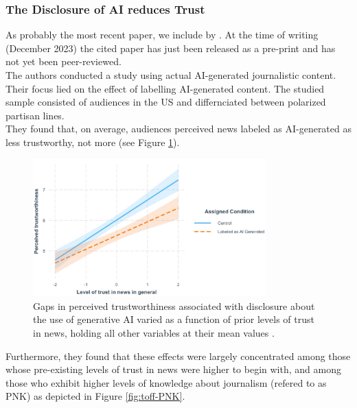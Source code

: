 \documentclass[
  a4paper,  %
  twoside,  %
  bibliography=totoc,
  headsepline,
  cleardoublepage=empty,
  parskip=half,
  draft=false
]{scrbook}
\begin{document}
\subsubsection*{The Disclosure of AI reduces Trust}
As probably the most recent paper, we include  by \citeauthor{toffTheyCouldJust2023}. At the time of writing (December 2023) the cited paper has just been released as a pre-print and has not yet been peer-reviewed. \\
The authors conducted a study using actual AI-generated journalistic content. Their focus lied on the effect of labelling AI-generated content. The studied sample consisted of audiences in the US and differnciated between polarized partisan lines. \\
They found that, on average, audiences perceived news labeled as AI-generated as less trustworthy, not more (see Figure \ref{fig:toff-trust}). 

\begin{figure}[h]
  \centering
  \includegraphics[width=0.8\textwidth]{./graphics/toff/Trust in news.png}
  \caption{Gaps in perceived trustworthiness associated with disclosure about the use of generative AI varied as a function of prior levels of trust in news, holding all other variables at their mean values \cite{toffTheyCouldJust2023}.}
  \label{fig:toff-trust}
\end{figure}

Furthermore, they found that these effects were largely concentrated among those whose pre-existing levels of trust in news were higher to begin with, and among those who exhibit higher levels of knowledge about journalism (refered to as PNK) as depicted in Figure \ref{fig:toff-PNK}.
\end{document}
